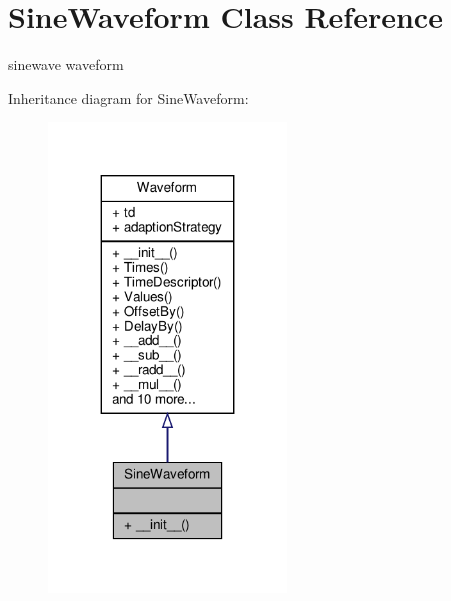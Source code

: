 \hypertarget{classSignalIntegrity_1_1TimeDomain_1_1Waveform_1_1SineWaveform_1_1SineWaveform}{}\section{Sine\+Waveform Class Reference}
\label{classSignalIntegrity_1_1TimeDomain_1_1Waveform_1_1SineWaveform_1_1SineWaveform}


sinewave waveform  




Inheritance diagram for Sine\+Waveform\+:
\nopagebreak
\begin{figure}[H]
\begin{center}
\leavevmode
\includegraphics[width=179pt]{classSignalIntegrity_1_1TimeDomain_1_1Waveform_1_1SineWaveform_1_1SineWaveform__inherit__graph}
\end{center}
\end{figure}


